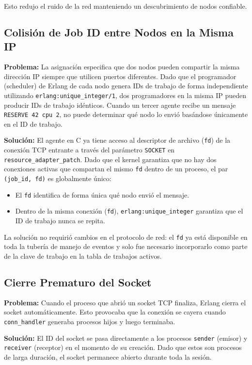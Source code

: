 \documentclass[12pt,a4paper]{article}
\begin{document}
Esto redujo el ruido de la red manteniendo un descubrimiento de nodos confiable.

\subsection{Colisión de Job ID entre Nodos en la Misma IP}

\textbf{Problema:} La asignación especifica que dos nodos pueden compartir la misma dirección IP siempre que utilicen puertos diferentes. Dado que el programador (scheduler) de Erlang de cada nodo genera IDs de trabajo de forma independiente utilizando \texttt{erlang:unique\_integer/1}, dos programadores en la misma IP pueden producir IDs de trabajo idénticos. Cuando un tercer agente recibe un mensaje \texttt{RESERVE 42 cpu 2}, no puede determinar qué nodo lo envió basándose únicamente en el ID de trabajo.

\textbf{Solución:} El agente en C ya tiene acceso al descriptor de archivo (\texttt{fd}) de la conexión TCP entrante a través del parámetro \texttt{SOCKET} en \texttt{resource\_adapter\_patch}. Dado que el kernel garantiza que no hay dos conexiones activas que compartan el mismo \texttt{fd} dentro de un proceso, el par \texttt{(job\_id, fd)} es globalmente único:

\begin{itemize}
\item El \texttt{fd} identifica de forma única qué nodo envió el mensaje.
\item Dentro de la misma conexión (\texttt{fd}), \texttt{erlang:unique\_integer} garantiza que el ID de trabajo nunca se repita.
\end{itemize}

La solución no requirió cambios en el protocolo de red: el \texttt{fd} ya está disponible en toda la tubería de manejo de eventos y solo fue necesario incorporarlo como parte de la clave de trabajo en la tabla de trabajos activos.

\subsection{Cierre Prematuro del Socket}

\textbf{Problema:} Cuando el proceso que abrió un socket TCP finaliza, Erlang cierra el socket automáticamente. Esto provocaba que la conexión se cayera cuando \texttt{conn\_handler} generaba procesos hijos y luego terminaba.

\textbf{Solución:} El ID del socket se pasa directamente a los procesos \texttt{sender} (emisor) y \texttt{receiver} (receptor) en el momento de su creación. Dado que estos son procesos de larga duración, el socket permanece abierto durante toda la sesión.
\end{document}
